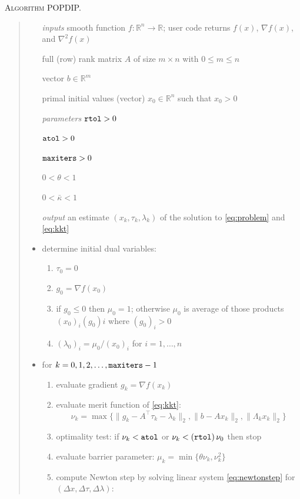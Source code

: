 \documentclass[11pt]{article}
\newcommand{\RR}{\mathbb{R}}
\newcommand{\grad}{\nabla}
\begin{document}
\bigskip
\noindent \textsc{Algorithm POPDIP.}
\begin{quote}
\begin{itemize}
\item[\emph{inputs}]  smooth function $f:\RR^n\to\RR$; user code returns $f(x)$, $\grad f(x)$, and $\grad^2 f(x)$
\item[]  full (row) rank matrix $A$ of size $m\times n$ with $0\le m\le n$
\item[]  vector $b\in\RR^m$
\item[]  primal initial values (vector) $x_0\in\RR^n$ such that $x_0 > 0$
\item[\emph{parameters}]  $\text{\texttt{rtol}}>0$
\item[]  $\text{\texttt{atol}}>0$
\item[]  $\text{\texttt{maxiters}}>0$
\item[]  $0<\theta<1$
\item[]  $0<\bar\kappa<1$
\item[\emph{output}]  an estimate $(x_k,\tau_k,\lambda_k)$ of the solution to \eqref{eq:problem} and \eqref{eq:kkt}
\item  determine initial dual variables:
    \renewcommand{\labelenumi}{(\roman{enumi})}
    \begin{enumerate}
    \item $\tau_0 = 0$
    \item $g_0 = \grad f(x_0)$
    \item if $g_0 \le 0$ then $\mu_0=1$; otherwise $\mu_0$ is average of those products $(x_0)_i (g_0)i$ where $(g_0)_i > 0$
    \item $(\lambda_0)_i = \mu_0 / (x_0)_i$ for $i=1,\dots,n$
    \end{enumerate}
\item  for $k=0,1,2,\dots,\text{\texttt{maxiters}}-1$
    \renewcommand{\labelenumi}{(\roman{enumi})}
    \begin{enumerate}
    \item evaluate gradient $g_k = \grad f(x_k)$
    \item evaluate merit function of \eqref{eq:kkt}:
    $$\nu_k = \max\{\|g_k-A^\top \tau_k - \lambda_k\|_2,\|b-Ax_k\|_2,\|\Lambda_k x_k\|_2\}$$
    \item optimality test: if $\nu_k<\text{\texttt{atol}}$ or $\nu_k<(\text{\texttt{rtol}})\, \nu_0$ then stop
    \item evaluate barrier parameter: $\mu_k = \min\{\theta \nu_k,\nu_k^2\}$
    \item compute Newton step by solving linear system \eqref{eq:newtonstep} for $(\Delta x,\Delta \tau,\Delta \lambda)$:

\end{enumerate}
\end{itemize}
\end{quote}
\end{document}
